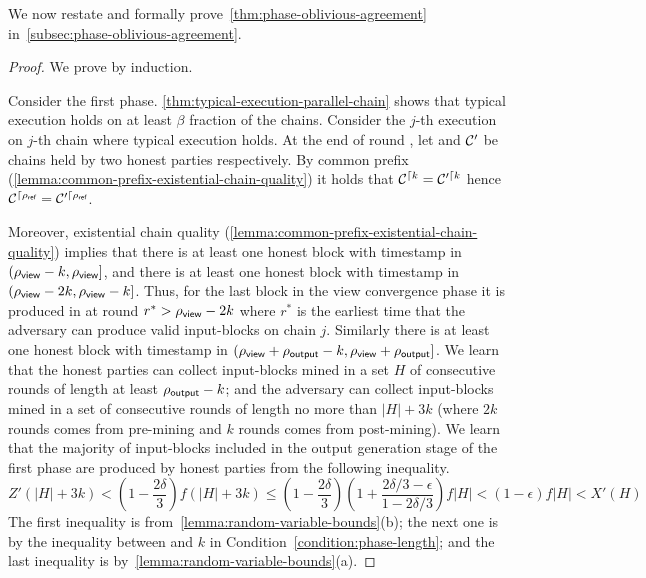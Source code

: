 We now restate and formally prove~\cref{thm:phase-oblivious-agreement} in~\cref{subsec:phase-oblivious-agreement}.

\theoremphaseobliviousagreement*

\begin{proof}
    We prove by induction.

    Consider the first phase.
    \cref{thm:typical-execution-parallel-chain} shows that typical execution holds on at least $\beta$ fraction of the chains.
    Consider the $j$-th execution on $j$-th chain where typical execution holds.
    At the end of round \phaseLength, let \chain and $\mathcal{C}'$ be chains held by two honest parties respectively.
    By common prefix (\cref{lemma:common-prefix-existential-chain-quality}) it holds that $\mathcal{C}^{\lceil{k}} = \mathcal{C}'^{\lceil{k}}$ hence $\mathcal{C}^{\lceil{\ensuremath{\rho_{\textsf{ref}}}}} = \mathcal{C}'^{\lceil{\ensuremath{\rho_{\textsf{ref}}}}}$.

    Moreover, existential chain quality (\cref{lemma:common-prefix-existential-chain-quality}) implies that there is at least one honest block with timestamp in $(\rho_{\textsf{view}} - k, \rho_{\textsf{view}}]$, and there is at least one honest block with timestamp in $(\rho_{\textsf{view}} - 2k, \rho_{\textsf{view}} - k]$.
    Thus, for the last block in the view convergence phase it is produced in at round $r^* > \rho_{\textsf{view}} - 2k$ where $r^*$ is the earliest time that the adversary can produce valid input-blocks on chain $j$.
    Similarly there is at least one honest block with timestamp in  $(\rho_{\textsf{view}} + \rho_{\textsf{output}} - k, \rho_{\textsf{view}} + \rho_{\textsf{output}}]$.
    We learn that the honest parties can collect input-blocks mined in a set $H$ of consecutive rounds of length at least $\rho_{\textsf{output}} - k$; and the adversary can collect input-blocks mined in a set of consecutive rounds of length no more than $|H| + 3k$ (where $2k$ rounds comes from pre-mining and $k$ rounds comes from post-mining).
    We learn that the majority of input-blocks included in the output generation stage of the first phase are produced by honest parties from the following inequality.
    \[ Z'(|H| + 3k) < (1 - \frac{2\delta}{3}) f (|H| + 3k) \le (1 - \frac{2\delta}{3}) (1 + \frac{2\delta / 3 - \epsilon}{1 - 2\delta / 3}) f |H| < (1 - \epsilon) f |H| < X'(H) \]
    The first inequality is from~\cref{lemma:random-variable-bounds}(b); the next one is by the inequality between \phaseViewLength and $k$ in Condition~\eqref{condition:phase-length}; and the last inequality is by~\cref{lemma:random-variable-bounds}(a).


\end{proof}
